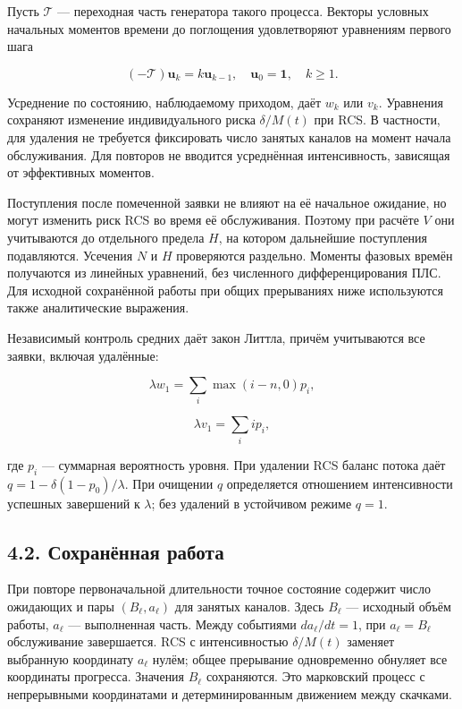 Пусть \(\mathcal T\) --- переходная часть генератора такого процесса. Векторы условных начальных моментов времени до поглощения удовлетворяют уравнениям первого шага


\[(-\mathcal T)\boldsymbol u_k=k\boldsymbol u_{k-1},\quad
\boldsymbol u_0=\mathbf1,\quad k\ge1.\]


Усреднение по состоянию, наблюдаемому приходом, даёт \(w_k\) или \(v_k\). Уравнения сохраняют изменение индивидуального риска \(\delta/M(t)\) при RCS. В частности, для удаления не требуется фиксировать число занятых каналов на момент начала обслуживания. Для повторов не вводится усреднённая интенсивность, зависящая от эффективных моментов.

Поступления после помеченной заявки не влияют на её начальное ожидание, но могут изменить риск RCS во время её обслуживания. Поэтому при расчёте \(V\) они учитываются до отдельного предела \(H\), на котором дальнейшие поступления подавляются. Усечения \(N\) и \(H\) проверяются раздельно. Моменты фазовых времён получаются из линейных уравнений, без численного дифференцирования ПЛС. Для исходной сохранённой работы при общих прерываниях ниже используются также аналитические выражения.

Независимый контроль средних даёт закон Литтла, причём учитываются все заявки, включая удалённые:


\[\lambda w_1=\sum_i\max(i-n,0)p_i,\]

\[\lambda v_1=\sum_i i p_i,\]


где \(p_i\) --- суммарная вероятность уровня. При удалении RCS баланс потока даёт \(q=1-\delta(1-p_0)/\lambda\). При очищении \(q\) определяется отношением интенсивности успешных завершений к \(\lambda\); без удалений в устойчивом режиме \(q=1\).

\subsection*{4.2. Сохранённая работа}
При повторе первоначальной длительности точное состояние содержит число ожидающих и пары \((B_\ell,a_\ell)\) для занятых каналов. Здесь \(B_\ell\) --- исходный объём работы, \(a_\ell\) --- выполненная часть. Между событиями \(da_\ell/dt=1\), при \(a_\ell=B_\ell\) обслуживание завершается. RCS с интенсивностью \(\delta/M(t)\) заменяет выбранную координату \(a_\ell\) нулём; общее прерывание одновременно обнуляет все координаты прогресса. Значения \(B_\ell\) сохраняются. Это марковский процесс с непрерывными координатами и детерминированным движением между скачками.

